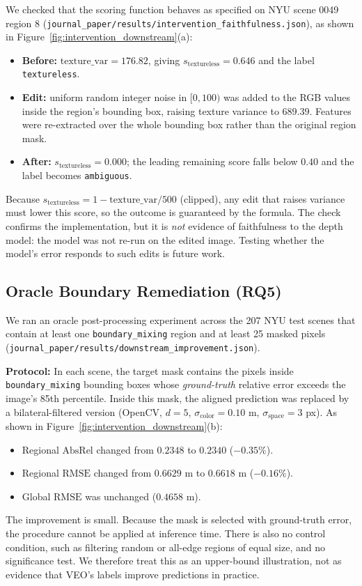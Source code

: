 \documentclass[11pt,a4paper]{article}
\begin{document}
We checked that the scoring function behaves as specified on NYU scene 0049 region 8 (\texttt{journal\_paper/results/intervention\_faithfulness.json}), as shown in Figure~\ref{fig:intervention_downstream}(a):
\begin{itemize}
    \item \textbf{Before:} $\text{texture\_var} = 176.82$, giving $s_{\mathrm{textureless}} = 0.646$ and the label \texttt{textureless}.
    \item \textbf{Edit:} uniform random integer noise in $[0, 100)$ was added to the RGB values inside the region's bounding box, raising texture variance to $689.39$. Features were re-extracted over the whole bounding box rather than the original region mask.
    \item \textbf{After:} $s_{\mathrm{textureless}} = 0.000$; the leading remaining score falls below $0.40$ and the label becomes \texttt{ambiguous}.
\end{itemize}
Because $s_{\mathrm{textureless}} = 1 - \text{texture\_var}/500$ (clipped), any edit that raises variance must lower this score, so the outcome is guaranteed by the formula. The check confirms the implementation, but it is \emph{not} evidence of faithfulness to the depth model: the model was not re-run on the edited image. Testing whether the model's error responds to such edits is future work.

\subsection{Oracle Boundary Remediation (RQ5)}
\label{sec:oracle}
We ran an oracle post-processing experiment across the 207 NYU test scenes that contain at least one \texttt{boundary\_mixing} region and at least 25 masked pixels (\texttt{journal\_paper/results/downstream\_improvement.json}).

\textbf{Protocol:} In each scene, the target mask contains the pixels inside \texttt{boundary\_mixing} bounding boxes whose \emph{ground-truth} relative error exceeds the image's 85th percentile. Inside this mask, the aligned prediction was replaced by a bilateral-filtered version \citep{tomasi1998bilateral} (OpenCV, $d = 5$, $\sigma_{\mathrm{color}} = 0.10$ m, $\sigma_{\mathrm{space}} = 3$ px). As shown in Figure~\ref{fig:intervention_downstream}(b):
\begin{itemize}
    \item Regional $\text{AbsRel}$ changed from $0.2348$ to $0.2340$ ($-0.35\%$).
    \item Regional $\text{RMSE}$ changed from $0.6629\text{ m}$ to $0.6618\text{ m}$ ($-0.16\%$).
    \item Global $\text{RMSE}$ was unchanged ($0.4658$ m).
\end{itemize}
The improvement is small. Because the mask is selected with ground-truth error, the procedure cannot be applied at inference time. There is also no control condition, such as filtering random or all-edge regions of equal size, and no significance test. We therefore treat this as an upper-bound illustration, not as evidence that VEO's labels improve predictions in practice.
\end{document}
